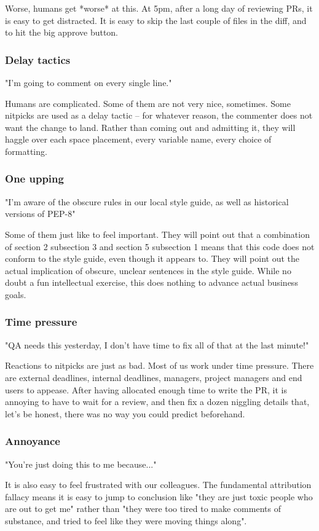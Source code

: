 Worse,
humans get *worse* at this.
At 5pm,
after a long day of reviewing PRs,
it is easy to get distracted.
It is easy to skip the last couple of files
in the diff,
and to hit the big approve button.

\begin{frame}
\frametitle{Delay tactics}
"I'm going to comment on every single line."
\end{frame}

Humans are complicated.
Some of them are not very nice,
sometimes.
Some nitpicks are used as a delay tactic --
for whatever reason,
the commenter does not want the change to land.
Rather than coming out and admitting it,
they will haggle over each space placement,
every variable name,
every choice of formatting.

\begin{frame}
\frametitle{One upping}
"I'm aware of the obscure rules in our local style guide,
as well as historical versions of PEP-8"
\end{frame}

Some of them just like to feel important.
They will point out that a combination of section 2 subsection 3
and section 5 subsection 1 means that this code does not
conform to the style guide,
even though it appears to.
They will point out the actual implication
of obscure,
unclear
sentences in the style guide.
While no doubt a fun intellectual exercise,
this does nothing to advance actual business goals.

\begin{frame}
\frametitle{Time pressure}
"QA needs this yesterday,
I don't have time to fix all of that at the last minute!"
\end{frame}

Reactions to nitpicks are just as bad.
Most of us work under time pressure.
There are external deadlines,
internal deadlines,
managers,
project managers
and end users to appease.
After having allocated enough time to write the PR,
it is annoying to have to wait for a review,
and then fix a dozen niggling details that,
let's be honest,
there was no way you could predict beforehand.

\begin{frame}
\frametitle{Annoyance}
"You're just doing this to me because..."
\end{frame}

It is also easy to feel frustrated with our colleagues.
The fundamental attribution fallacy means it is easy 
to jump to conclusion like
"they are just toxic people who are out to get me"
rather than
"they were too tired to make comments of substance,
and tried to feel like they were moving things along".

